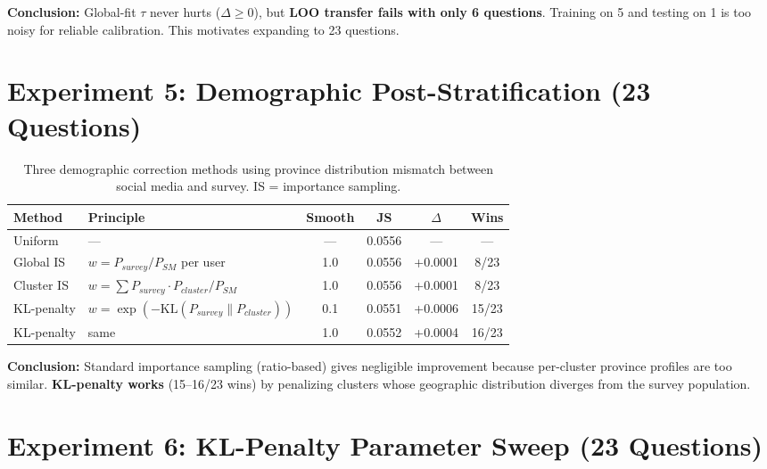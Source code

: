 \documentclass[10pt,a4paper]{article}
\begin{document}
\textbf{Conclusion:} Global-fit $\tau$ never hurts ($\Delta \geq 0$), but \textbf{LOO transfer fails with only 6 questions}. Training on 5 and testing on 1 is too noisy for reliable calibration. This motivates expanding to 23 questions.

\section{Experiment 5: Demographic Post-Stratification (23 Questions)}

\begin{table}[h]
\centering\small
\caption{Three demographic correction methods using province distribution mismatch between social media and survey. IS = importance sampling.}
\begin{tabular}{@{}llcccc@{}}
\toprule
Method & Principle & Smooth & JS & $\Delta$ & Wins \\
\midrule
Uniform & --- & --- & 0.0556 & --- & --- \\
Global IS & $w = P_{survey}/P_{SM}$ per user & 1.0 & 0.0556 & +0.0001 & 8/23 \\
Cluster IS & $w = \sum P_{survey} \cdot P_{cluster}/P_{SM}$ & 1.0 & 0.0556 & +0.0001 & 8/23 \\
\rowcolor{best} KL-penalty & $w = \exp(-\text{KL}(P_{survey} \| P_{cluster}))$ & 0.1 & 0.0551 & +0.0006 & 15/23 \\
KL-penalty & same & 1.0 & 0.0552 & +0.0004 & 16/23 \\
\bottomrule
\end{tabular}
\end{table}

\textbf{Conclusion:} Standard importance sampling (ratio-based) gives negligible improvement because per-cluster province profiles are too similar. \textbf{KL-penalty works} (15--16/23 wins) by penalizing clusters whose geographic distribution diverges from the survey population.

\section{Experiment 6: KL-Penalty Parameter Sweep (23 Questions)}
\end{document}
